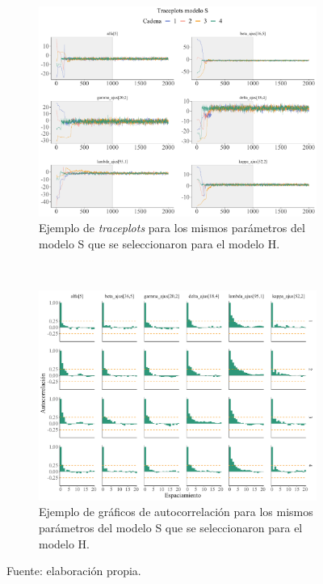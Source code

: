 \begin{figure}
\begin{subfigure}{0.4\textwidth}
	\includegraphics[width = \textwidth]{Figs/Convergencia/Convergencia_Traceplots_s}
	\caption{Ejemplo de \textit{traceplots} para los mismos parámetros del modelo S que se seleccionaron para el modelo H.}
	\label{fig:Traceplots_S}
	\end{subfigure}
	~
	\begin{subfigure}{0.4\textwidth}
	\includegraphics[width = \textwidth]{Figs/Convergencia/Convergencia_AutoCorr_S}
	\caption{Ejemplo de gráficos de autocorrelación para los mismos parámetros del modelo S que se seleccionaron para el modelo H.}
	\label{fig:Autocorr_S}
	\end{subfigure}
	\caption{Fuente: elaboración propia.}
\end{figure}

